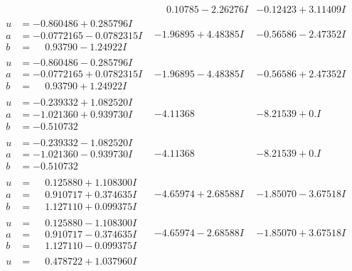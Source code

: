 \documentclass[1p]{elsarticle_modified}
\theoremstyle{definition}
\begin{document}
$$\begin{array}{c|c|c}
 & \phantom{-}0.10785 - 2.26276 I & -0.12423 + 3.11409 I \\ \hline\begin{aligned}
u &= -0.860486 + 0.285796 I \\
a &= -0.0772165 - 0.0782315 I \\
b &= \phantom{-}0.93790 - 1.24922 I\end{aligned}
 & -1.96895 + 4.48385 I & -0.56586 - 2.47352 I \\ \hline\begin{aligned}
u &= -0.860486 - 0.285796 I \\
a &= -0.0772165 + 0.0782315 I \\
b &= \phantom{-}0.93790 + 1.24922 I\end{aligned}
 & -1.96895 - 4.48385 I & -0.56586 + 2.47352 I \\ \hline\begin{aligned}
u &= -0.239332 + 1.082520 I \\
a &= -1.021360 + 0.939730 I \\
b &= -0.510732\phantom{ +0.000000I}\end{aligned}
 & -4.11368\phantom{ +0.000000I} & -8.21539 + 0. I\phantom{ +0.000000I} \\ \hline\begin{aligned}
u &= -0.239332 - 1.082520 I \\
a &= -1.021360 - 0.939730 I \\
b &= -0.510732\phantom{ +0.000000I}\end{aligned}
 & -4.11368\phantom{ +0.000000I} & -8.21539 + 0. I\phantom{ +0.000000I} \\ \hline\begin{aligned}
u &= \phantom{-}0.125880 + 1.108300 I \\
a &= \phantom{-}0.910717 + 0.374635 I \\
b &= \phantom{-}1.127110 + 0.099375 I\end{aligned}
 & -4.65974 + 2.68588 I & -1.85070 - 3.67518 I \\ \hline\begin{aligned}
u &= \phantom{-}0.125880 - 1.108300 I \\
a &= \phantom{-}0.910717 - 0.374635 I \\
b &= \phantom{-}1.127110 - 0.099375 I\end{aligned}
 & -4.65974 - 2.68588 I & -1.85070 + 3.67518 I \\ \hline\begin{aligned}
u &= \phantom{-}0.478722 + 1.037960 I \\

\end{aligned}
\end{array}$$
\end{document}

